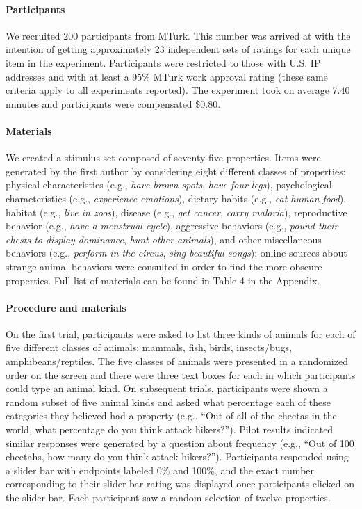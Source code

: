 \documentclass[,man,floatsintext]{apa6}
\let\oldparagraph\paragraph
\renewcommand{\paragraph}[1]{\oldparagraph{#1}\mbox{}}
\theoremstyle{definition}
\theoremstyle{definition}
\theoremstyle{definition}
\theoremstyle{remark}
\begin{document}
\hypertarget{participants-2}{%
\paragraph{Participants}\label{participants-2}}

We recruited 200 participants from MTurk. This number was arrived at
with the intention of getting approximately 23 independent sets of
ratings for each unique item in the experiment. Participants were
restricted to those with U.S. IP addresses and with at least a 95\%
MTurk work approval rating (these same criteria apply to all experiments
reported). The experiment took on average 7.40 minutes and participants
were compensated \$0.80.

\hypertarget{materials}{%
\paragraph{Materials}\label{materials}}

We created a stimulus set composed of seventy-five properties. Items
were generated by the first author by considering eight different
classes of properties: physical characteristics (e.g., \emph{have brown
spots}, \emph{have four legs}), psychological characteristics (e.g.,
\emph{experience emotions}), dietary habits (e.g., \emph{eat human
food}), habitat (e.g., \emph{live in zoos}), disease (e.g., \emph{get
cancer}, \emph{carry malaria}), reproductive behavior (e.g., \emph{have
a menstrual cycle}), aggressive behaviors (e.g., \emph{pound their
chests to display dominance}, \emph{hunt other animals}), and other
miscellaneous behaviors (e.g., \emph{perform in the circus}, \emph{sing
beautiful songs}); online sources about strange animal behaviors were
consulted in order to find the more obscure properties. Full list of
materials can be found in Table 4 in the Appendix.

\hypertarget{procedure-and-materials-2}{%
\paragraph{Procedure and materials}\label{procedure-and-materials-2}}

On the first trial, participants were asked to list three kinds of
animals for each of five different classes of animals: mammals, fish,
birds, insects/bugs, amphibeans/reptiles. The five classes of animals
were presented in a randomized order on the screen and there were three
text boxes for each in which participants could type an animal kind. On
subsequent trials, participants were shown a random subset of five
animal kinds and asked what percentage each of these categories they
believed had a property (e.g., \enquote{Out of all of the cheetas in the
world, what percentage do you think attack hikers?}). Pilot results
indicated similar responses were generated by a question about frequency
(e.g., \enquote{Out of 100 cheetahs, how many do you think attack
hikers?}). Participants responded using a slider bar with endpoints
labeled 0\% and 100\%, and the exact number corresponding to their
slider bar rating was displayed once participants clicked on the slider
bar. Each participant saw a random selection of twelve properties.
\end{document}
